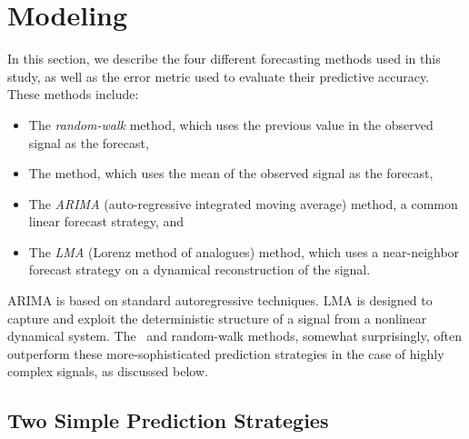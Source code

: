\section{Modeling }\label{sec:model}
% 
% 
% 
% 

In this section, we describe the four different forecasting methods
used in this study, as well as the error metric used to evaluate their
predictive accuracy.  These methods include:
\begin{itemize}
\item The \emph{random-walk} method, which uses the previous value in
  the observed signal as the forecast,

\item The \emph{\naive} method, which uses the mean of the
  observed signal as the forecast,

\item The \emph{ARIMA} (auto-regressive integrated moving average)
  method, a common linear forecast strategy, and

\item The \emph{LMA} (Lorenz method of analogues) method, which uses a
  near-neighbor forecast strategy on a dynamical reconstruction of the
  signal.
\end{itemize}
ARIMA is based on standard autoregressive techniques.  LMA is designed
to capture and exploit the deterministic structure of a signal from a
nonlinear dynamical system.  The \naive ~and random-walk methods,
somewhat surprisingly, often outperform these more-sophisticated
prediction strategies in the case of highly complex signals, as
discussed below.

\subsection{Two Simple Prediction Strategies}
\label{sec:simple}

